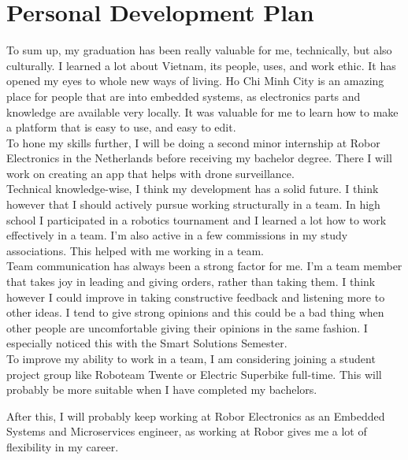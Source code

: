 \documentclass[11pt, a4paper]{article}
\begin{document}
\newpage
\section{Personal Development Plan}
To sum up, my graduation has been really valuable for me, technically, but also culturally. I learned a lot about Vietnam, its people, uses, and work ethic. It has opened my eyes to whole new ways of living. Ho Chi Minh City is an amazing place for people that are into embedded systems, as electronics parts and knowledge are available very locally. It was valuable for me to learn how to make a platform that is easy to use, and easy to edit.\\

To hone my skills further, I will be doing a second minor internship at Robor Electronics in the Netherlands before receiving my bachelor degree. There I will work on creating an app that helps with drone surveillance.\\

Technical knowledge-wise, I think my development has a solid future. I think however that I should actively pursue working structurally in a team. In high school I participated in a robotics tournament and I learned a lot how to work effectively in a team. I'm also active in a few commissions in my study associations. This helped with me working in a team.\\

Team communication has always been a strong factor for me. I'm a team member that takes joy in leading and giving orders, rather than taking them. I think however I could improve in taking constructive feedback and listening more to other ideas. I tend to give strong opinions and this could be a bad thing when other people are uncomfortable giving their opinions in the same fashion. I especially noticed this with the Smart Solutions Semester.\\

To improve my ability to work in a team, I am considering joining a student project group like Roboteam Twente or Electric Superbike full-time. This will probably be more suitable when I have completed my bachelors. 

After this, I will probably keep working at Robor Electronics as an Embedded Systems and Microservices engineer, as working at Robor gives me a lot of flexibility in my career.

\newpage
\printbibliography
\end{document}
